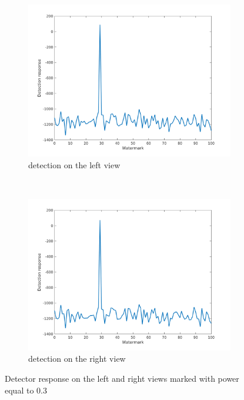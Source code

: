 \begin{figure}[h!]
    \centering
    \begin{subfigure}[t]{0.5\textwidth}
        \centering
       \includegraphics[width=1\textwidth]{./img/likelihood/correct_LikelihoodL_03.png}
          \caption{\small{detection on the left view}}
          \label{fig:Ll03}

    \end{subfigure}%
    ~ 
    \begin{subfigure}[t]{0.5\textwidth}
        \centering
        \includegraphics[width=1\textwidth]{./img/likelihood/correct_LikelihoodLr_03.png}
           \caption{\small{detection on the right view}}
           \label{fig:Lr03}
    \end{subfigure}
    \caption{Detector response on the left and right views marked with power equal to 0.3}
     \label{fig:Lr}
\end{figure}


